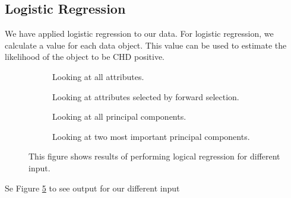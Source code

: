 \subsection{Logistic Regression}

We have applied logistic regression to our data. For logistic regression, we calculate a value for each data object. This value can be used to estimate the likelihood of the object to be CHD positive.

\begin{figure}
	\begin{subfigure}
	\texttt{[image: logisticregressionX.png]}
	\caption{Looking at all attributes.}
	\label{logicalRegressionResultX}
	\end{subfigure}

	\begin{subfigure}
	\texttt{[image: logisticregressionXad.png]}	
	\caption{Looking at attributes selected by forward selection.}
	\label{logicalRegressionResultXad}
	\end{subfigure}

	\begin{subfigure}
	\texttt{[image: logisticregressionXPA.png]}
	\caption{Looking at all principal components.}
	\label{logicalRegressionResultXPA}
	\end{subfigure}

	\begin{subfigure}
	\texttt{[image: logisticregressionX2PA.png]}
	\caption{Looking at two most important principal components.}
	\label{logicalRegressionResultX2PA}
	\end{subfigure}
\caption{This figure shows results of performing logical regression for different input.}
\label{logicalRegressionResults}
\end{figure}

Se Figure \ref{logicalRegressionResults} to see output for our different input